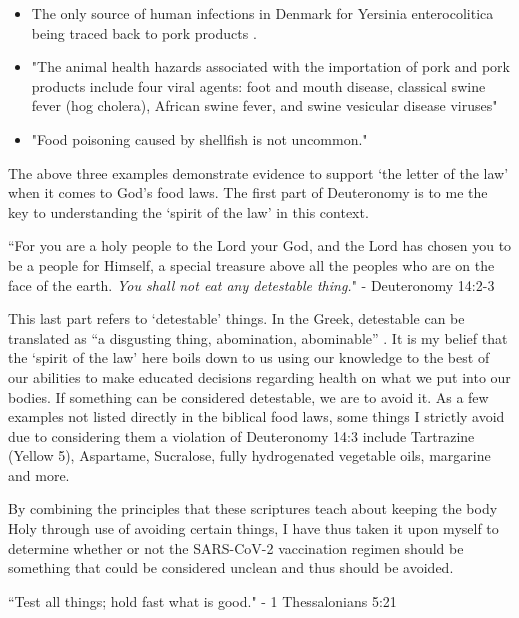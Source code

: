 \documentclass[10pt, a4paper, twocolumn]{book}
\begin{document}
\begin{itemize}
	\item The only source of human infections in Denmark for Yersinia enterocolitica being traced back to pork products \citep{unclean:Pork}.
	\item "The animal health hazards associated with the importation of pork and pork products include four viral agents: foot and mouth disease, classical swine fever (hog cholera), African swine fever, and swine vesicular disease viruses" \citep{unclean:Pork2}
	\item "Food poisoning caused by shellfish is not uncommon." \citep{unclean:shellfish}
\end{itemize}

The above three examples demonstrate evidence to support `the letter of the law' when it comes to God's food laws. The first part of Deuteronomy is to me the key to understanding the `spirit of the law' in this context. 

\begin{formal}
	``For you are a holy people to the Lord your God, and the Lord has chosen you to be a people for Himself, a special treasure above all the peoples who are on the face of the earth. \textit{You shall not eat any detestable thing.}" - Deuteronomy 14:2-3
\end{formal}

This last part refers to `detestable' things. In the Greek, detestable can be translated as ``a disgusting thing, abomination, abominable'' \citep{Strongs}. It is my belief that the `spirit of the law' here boils down to us using our knowledge to the best of our abilities to make educated decisions regarding health on what we put into our bodies. If something can be considered detestable, we are to avoid it. As a few examples not listed directly in the biblical food laws, some things I strictly avoid due to considering them a violation of Deuteronomy 14:3 include Tartrazine (Yellow 5), Aspartame, Sucralose, fully hydrogenated vegetable oils, margarine and more. 

By combining the principles that these scriptures teach about keeping the body Holy through use of avoiding certain things, I have thus taken it upon myself to determine whether or not the SARS-CoV-2 vaccination regimen should be something that could be considered unclean and thus should be avoided. 

\begin{formal}
	``Test all things; hold fast what is good." - 1 Thessalonians 5:21
\end{formal}
\end{document}
